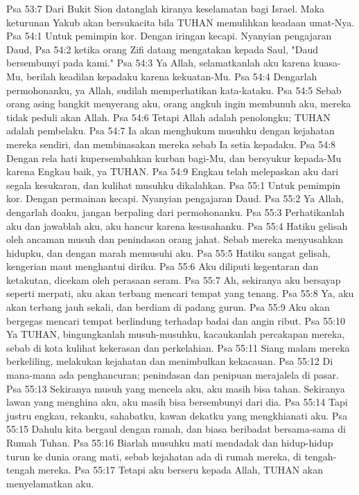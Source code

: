 Psa 53:7  Dari Bukit Sion datanglah kiranya keselamatan bagi Israel. Maka keturunan Yakub akan bersukacita bila TUHAN memulihkan keadaan umat-Nya.
Psa 54:1  Untuk pemimpin kor. Dengan iringan kecapi. Nyanyian pengajaran Daud,
Psa 54:2  ketika orang Zifi datang mengatakan kepada Saul, "Daud bersembunyi pada kami."
Psa 54:3  Ya Allah, selamatkanlah aku karena kuasa-Mu, berilah keadilan kepadaku karena kekuatan-Mu.
Psa 54:4  Dengarlah permohonanku, ya Allah, sudilah memperhatikan kata-kataku.
Psa 54:5  Sebab orang asing bangkit menyerang aku, orang angkuh ingin membunuh aku, mereka tidak peduli akan Allah.
Psa 54:6  Tetapi Allah adalah penolongku; TUHAN adalah pembelaku.
Psa 54:7  Ia akan menghukum musuhku dengan kejahatan mereka sendiri, dan membinasakan mereka sebab Ia setia kepadaku.
Psa 54:8  Dengan rela hati kupersembahkan kurban bagi-Mu, dan bersyukur kepada-Mu karena Engkau baik, ya TUHAN.
Psa 54:9  Engkau telah melepaskan aku dari segala kesukaran, dan kulihat musuhku dikalahkan.
Psa 55:1  Untuk pemimpin kor. Dengan permainan kecapi. Nyanyian pengajaran Daud.
Psa 55:2  Ya Allah, dengarlah doaku, jangan berpaling dari permohonanku.
Psa 55:3  Perhatikanlah aku dan jawablah aku, aku hancur karena kesusahanku.
Psa 55:4  Hatiku gelisah oleh ancaman musuh dan penindasan orang jahat. Sebab mereka menyusahkan hidupku, dan dengan marah memusuhi aku.
Psa 55:5  Hatiku sangat gelisah, kengerian maut menghantui diriku.
Psa 55:6  Aku diliputi kegentaran dan ketakutan, dicekam oleh perasaan seram.
Psa 55:7  Ah, sekiranya aku bersayap seperti merpati, aku akan terbang mencari tempat yang tenang.
Psa 55:8  Ya, aku akan terbang jauh sekali, dan berdiam di padang gurun.
Psa 55:9  Aku akan bergegas mencari tempat berlindung terhadap badai dan angin ribut.
Psa 55:10  Ya TUHAN, bingungkanlah musuh-musuhku, kacaukanlah percakapan mereka, sebab di kota kulihat kekerasan dan perkelahian.
Psa 55:11  Siang malam mereka berkeliling, melakukan kejahatan dan menimbulkan kekacauan.
Psa 55:12  Di mana-mana ada penghancuran; penindasan dan penipuan merajalela di pasar.
Psa 55:13  Sekiranya musuh yang mencela aku, aku masih bisa tahan. Sekiranya lawan yang menghina aku, aku masih bisa bersembunyi dari dia.
Psa 55:14  Tapi justru engkau, rekanku, sahabatku, kawan dekatku yang mengkhianati aku.
Psa 55:15  Dahulu kita bergaul dengan ramah, dan biasa beribadat bersama-sama di Rumah Tuhan.
Psa 55:16  Biarlah musuhku mati mendadak dan hidup-hidup turun ke dunia orang mati, sebab kejahatan ada di rumah mereka, di tengah-tengah mereka.
Psa 55:17  Tetapi aku berseru kepada Allah, TUHAN akan menyelamatkan aku.
